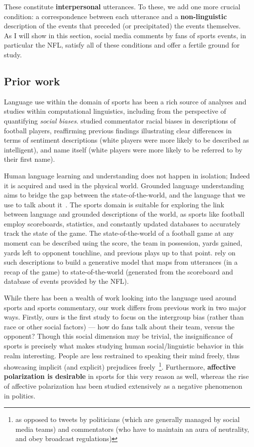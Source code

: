 These constitute \textbf{interpersonal} utterances. To these, we add one more crucial condition: a correspondence between each utterance and a \textbf{non-linguistic} description of the events that preceded (or precipitated) the events themselves. As I will show in this section, social media comments by fans of sports events, in particular the NFL, satisfy all of these conditions and offer a fertile ground for study.

\subsection{Prior work} 


Language use within the domain of sports has been a rich source of analyses and studies within computational linguistics, including from the perspective of quantifying \emph{social biases}. \citet{merullo-etal-2019-investigating} studied commentator racial biases in descriptions of football players, reaffirming previous findings illustrating clear differences in terms of sentiment descriptions (white players were more likely to be described as intelligent), and name itself (white players were more likely to be referred to by their first name). 

Human language learning and understanding does not happen in isolation; Indeed it is acquired and used in the physical world. Grounded language understanding aims to bridge the gap between the state-of-the-world, and the language that we use to talk about it~\citep{krishnamurthy2013jointly}. The sports domain is suitable for exploring the link between language and grounded descriptions of the world, as sports like football employ scoreboards, statistics, and constantly updated databases to accurately track the state of the game. The state-of-the-world of a football game at any moment can be described using the score, the team in possession, yards gained, yards left to opponent touchline, and previous plays up to that point. \citet{liang-etal-2009-learning} rely on such descriptions to build a generative model that maps from utterances (in a recap of the game) to state-of-the-world (generated from the scoreboard and database of events provided by the NFL).

While there has been a wealth of work looking into the language used around sports and sports commentary, our work differs from previous work in two major ways. Firstly, ours is the first study to focus on the intergroup bias (rather than race or other social factors) --- how do fans talk about their team, versus the opponent? Though this social dimension may be trivial, the insignificance of sports is precisely what makes studying human social/linguistic behavior in this realm interesting. People are less restrained to speaking their mind freely, thus showcasing implicit (and explicit) prejudices freely~\footnote{as opposed to tweets by politicians (which are generally managed by social media teams) and commentators (who have to maintain an aura of neutrality, and obey broadcast regulations)}. Furthermore, \textbf{affective polarization is desirable} in sports for this very reason as well, whereas the rise of affective polarization has been studied extensively as a negative phenomenon in politics\citep{iyengar_origins_2019}.


